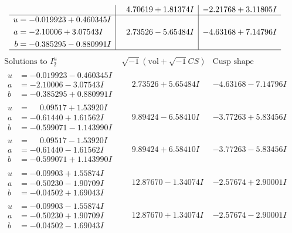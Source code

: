 \documentclass[1p]{elsarticle_modified}
\theoremstyle{definition}
\newcommand{\I}{\sqrt{-1}}
\begin{document}
$$\begin{array}{c|c|c}
 & \phantom{-}4.70619 + 1.81374 I & -2.21768 + 3.11805 I \\ \hline\begin{aligned}
u &= -0.019923 + 0.460345 I \\
a &= -2.10006 + 3.07543 I \\
b &= -0.385295 - 0.880991 I\end{aligned}
 & \phantom{-}2.73526 - 5.65484 I & -4.63168 + 7.14796 I\\
 \hline 
 \end{array}$$\newpage$$\begin{array}{c|c|c}  
\text{Solutions to }I^u_{2}& \I (\text{vol} + \sqrt{-1}CS) & \text{Cusp shape}\\
 \hline 
\begin{aligned}
u &= -0.019923 - 0.460345 I \\
a &= -2.10006 - 3.07543 I \\
b &= -0.385295 + 0.880991 I\end{aligned}
 & \phantom{-}2.73526 + 5.65484 I & -4.63168 - 7.14796 I \\ \hline\begin{aligned}
u &= \phantom{-}0.09517 + 1.53920 I \\
a &= -0.61440 + 1.61562 I \\
b &= -0.599071 - 1.143990 I\end{aligned}
 & \phantom{-}9.89424 - 6.58410 I & -3.77263 + 5.83456 I \\ \hline\begin{aligned}
u &= \phantom{-}0.09517 - 1.53920 I \\
a &= -0.61440 - 1.61562 I \\
b &= -0.599071 + 1.143990 I\end{aligned}
 & \phantom{-}9.89424 + 6.58410 I & -3.77263 - 5.83456 I \\ \hline\begin{aligned}
u &= -0.09903 + 1.55874 I \\
a &= -0.50230 - 1.90709 I \\
b &= -0.04502 + 1.69043 I\end{aligned}
 & \phantom{-}12.87670 - 1.34074 I & -2.57674 + 2.90001 I \\ \hline\begin{aligned}
u &= -0.09903 - 1.55874 I \\
a &= -0.50230 + 1.90709 I \\
b &= -0.04502 - 1.69043 I\end{aligned}
 & \phantom{-}12.87670 + 1.34074 I & -2.57674 - 2.90001 I \\ \hline\begin{aligned}

\end{aligned}
\end{array}$$
\end{document}

